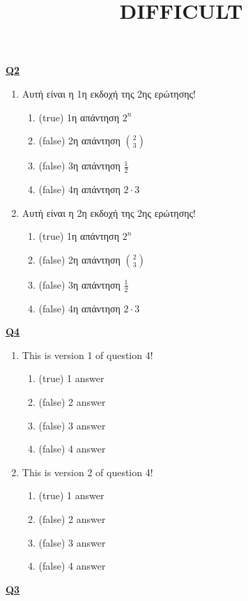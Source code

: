 \documentclass[a4paper, 11pt]{article}
\title{  DIFFICULT }
\begin{document}
\maketitle
\flushleft \underline{\bf Q2 }
\begin{enumerate}
\item Αυτή είναι η 1η εκδοχή της 2ης ερώτησης!
\begin{enumerate}
\item (true)  1η απάντηση $2^n$
\item (false)  2η απάντηση $\binom{2}{3}$
\item (false)  3η απάντηση $\frac{1}{2}$
\item (false)  4η απάντηση $2\cdot 3$
\end{enumerate}
\item Αυτή είναι η 2η εκδοχή της 2ης ερώτησης!
\begin{enumerate}
\item (true)  1η απάντηση $2^n$
\item (false)  2η απάντηση $\binom{2}{3}$
\item (false)  3η απάντηση $\frac{1}{2}$
\item (false)  4η απάντηση $2\cdot 3$
\end{enumerate}
\end{enumerate}
\flushleft \underline{\bf Q4 }
\begin{enumerate}
\item This is version 1 of question 4!
\begin{enumerate}
\item (true)  1 answer
\item (false)  2 answer
\item (false)  3 answer
\item (false)  4 answer
\end{enumerate}
\item This is version 2 of question 4!
\begin{enumerate}
\item (true)  1 answer
\item (false)  2 answer
\item (false)  3 answer
\item (false)  4 answer
\end{enumerate}
\end{enumerate}
\flushleft \underline{\bf Q3 }
\end{document}

